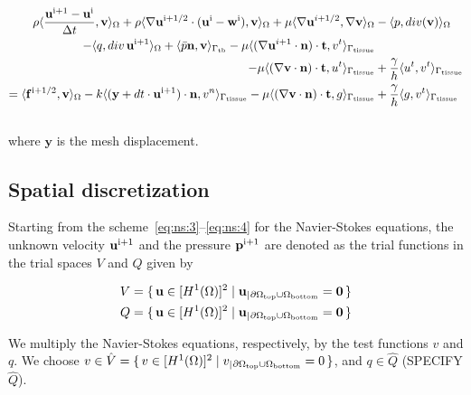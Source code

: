 \documentclass[11pt,a4paper,titlepage]{report}
\begin{document}
\begin{equation}
\begin{split}
\rho \langle \frac{\mathbf{u}^{\rm i+1} - \mathbf{u}^{\rm i}}{\Delta t}, \mathbf{v} \rangle_\Omega
+ \rho \langle \nabla \mathbf{u}^{\rm i+1/2} \cdot (\mathbf{u}^{\rm i} - \mathbf{w}^{\rm i}), \mathbf{v} \rangle_\Omega
+ \mu \langle \nabla \mathbf{u}^{i+1/2} , \nabla \mathbf{v} \rangle_\Omega
& - \langle p , div(\mathbf{v}) \rangle_\Omega \\
- \langle q , div \, \mathbf{u}^{\rm i+1} \rangle_\Omega
+ \langle \bar{p} \mathbf{n}, \mathbf{v} \rangle_{\Gamma_{\rm tb}}
- \mu \langle (\nabla \mathbf{u}^{i+1} \cdot \mathbf{n}) \cdot \mathbf{t} , v^t \rangle_{\Gamma_{\rm tissue}} \\
- \mu \langle (\nabla \mathbf{v} \cdot \mathbf{n}) \cdot \mathbf{t} , u^t \rangle_{\Gamma_{\rm tissue}} 
&+ \frac{\gamma}{h} \langle u^t , v^t \rangle_{\Gamma_{\rm tissue}} \\
= \langle \mathbf{f}^{\rm i + 1/2}, \mathbf{v} \rangle_\Omega
- k \langle (\mathbf{y} + dt \cdot \mathbf{u}^{\rm i+1}) \cdot \mathbf{n}, v^n \rangle_{\Gamma_{\rm tissue}}
- \mu \langle (\nabla \mathbf{v} \cdot \mathbf{n}) \cdot \mathbf{t}, g \rangle_{\Gamma_{\rm tissue}}
&+ \frac{\gamma}{h} \langle g, v^t \rangle_{\Gamma_{\rm tissue}}
\end{split}
\end{equation}
\\
where $\mathbf{y}$ is the mesh displacement.

\subsection{Spatial discretization}
Starting from the scheme~\eqref{eq:ns:3}--\eqref{eq:ns:4} for the Navier-Stokes equations, the unknown velocity $\mathbf{u}^{\rm i + 1}$ and the pressure $\mathbf{p}^{\rm i + 1}$ are denoted as the trial functions in the trial spaces $V$ and $Q$ given by

\begin{align*}
V &= \set{\mathbf{u} \in [H^1(\Omega)]^2 | \mathbf{u}_|{_{\partial \Omega_{\rm top} \cup \Omega_{\rm bottom}}} = \mathbf{0}} \\
Q &= \set{\mathbf{u} \in [H^1(\Omega)]^2 | \mathbf{u}_|{_{\partial \Omega_{\rm top} \cup \Omega_{\rm bottom}}} = \mathbf{0}}
\end{align*}



We multiply the Navier-Stokes equations, respectively, by the test functions $v$ and $q$. We choose $v \in \hat{V} = \set{v \in [H^1(\Omega)]^2 | v_|{_{\partial \Omega_{\rm top} \cup \Omega_{\rm bottom}}} = 0}$, and $q \in \hat{Q}$ (SPECIFY $\hat{Q}$).
\end{document}
